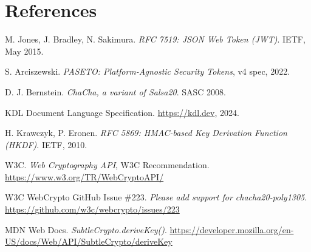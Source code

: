\documentclass[11pt, letterpaper]{article}
\begin{document}
\section*{References}

\begin{enumerate}[label={[\arabic*]}]
  \item M. Jones, J. Bradley, N. Sakimura.
        \textit{RFC 7519: JSON Web Token (JWT)}. IETF, May 2015.
  \item S. Arciszewski.
        \textit{PASETO: Platform-Agnostic Security Tokens}, v4 spec, 2022.
  \item D. J. Bernstein.
        \textit{ChaCha, a variant of Salsa20}. SASC 2008.
  \item KDL Document Language Specification. \url{https://kdl.dev}, 2024.
  \item H. Krawczyk, P. Eronen.
        \textit{RFC 5869: HMAC-based Key Derivation Function (HKDF)}. IETF, 2010.
  \item W3C.
        \textit{Web Cryptography API}, W3C Recommendation.
        \url{https://www.w3.org/TR/WebCryptoAPI/}
  \item W3C WebCrypto GitHub Issue \#223.
        \textit{Please add support for chacha20-poly1305}.
        \url{https://github.com/w3c/webcrypto/issues/223}
  \item MDN Web Docs.
        \textit{SubtleCrypto.deriveKey()}.
        \url{https://developer.mozilla.org/en-US/docs/Web/API/SubtleCrypto/deriveKey}
\end{enumerate}
\end{document}
